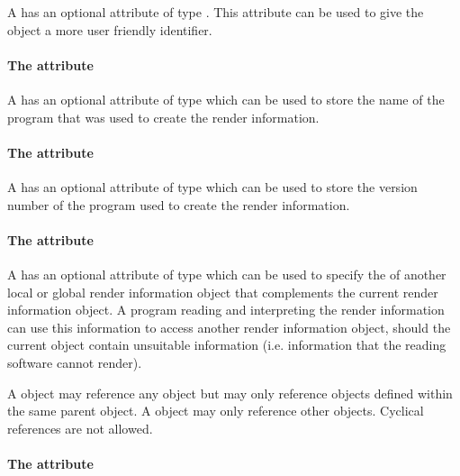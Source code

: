 A \RenderInformationBase has an optional attribute  of type
. This  attribute can be used to give the object a 
more user friendly identifier.

\paragraph{The \fixttspace{} attribute}

A \RenderInformationBase has an optional attribute 
of type  which can be used to store the name of the program 
that was used to create the render information.

\paragraph{The \fixttspace{} attribute}

A \RenderInformationBase has an optional attribute
 of type  which can be used to store 
the version number of the program used to create the render information.

\paragraph{The \fixttspace{} attribute}

A \RenderInformationBase has an optional attribute
 of type  which can be used to 
specify the  of another local or global render information object 
that complements the current render information object. A program reading and 
interpreting the render information can use this information to access another 
render information object, should the current object contain unsuitable information (i.e. information that the reading software cannot render). 

A \LocalRenderInformation object may reference any 
\GlobalRenderInformation object but may only reference \LocalRenderInformation objects defined within the same parent  object. 
A \GlobalRenderInformation object may only reference other \GlobalRenderInformation objects. Cyclical references are not allowed.


\paragraph{The \fixttspace{} attribute}

